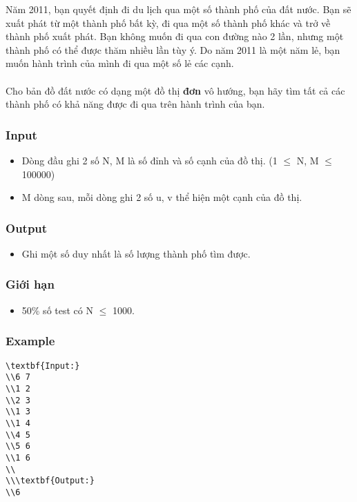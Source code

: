 



   Năm 2011, bạn quyết định đi du lịch qua một số thành phố của đất nước. Bạn sẽ xuất phát từ một thành phố bất kỳ, đi qua một số thành phố khác và trở về thành phố xuất phát. Bạn không muốn đi qua con đường nào 2 lần, nhưng một thành phố có thể được thăm nhiều lần tùy ý. Do năm 2011 là một năm lẻ, bạn muốn hành trình của mình đi qua một số lẻ các cạnh.   
\\
\\   Cho bản đồ đất nước có dạng một đồ thị   \textbf{    đơn   }   vô hướng, bạn hãy tìm tất cả các thành phố có khả năng được đi qua trên hành trình của bạn.  

\subsubsection{   Input  }
\begin{itemize}
	\item     Dòng đầu ghi 2 số N, M là số đỉnh và số cạnh của đồ thị. (1  $\le$  N, M  $\le$  100000)   
\end{itemize}
\begin{itemize}
	\item     M dòng sau, mỗi dòng ghi 2 số u, v thể hiện một cạnh của đồ thị.   
\end{itemize}

\subsubsection{   Output  }
\begin{itemize}
	\item     Ghi một số duy nhất là số lượng thành phố tìm được.   
\end{itemize}

\subsubsection{   Giới hạn  }
\begin{itemize}
	\item     50\% số test có N  $\le$  1000.   
\end{itemize}

\subsubsection{   Example  }
\begin{verbatim}
\textbf{Input:}
\\6 7
\\1 2
\\2 3
\\1 3
\\1 4
\\4 5
\\5 6
\\1 6
\\
\\\textbf{Output:}
\\6\end{verbatim}
